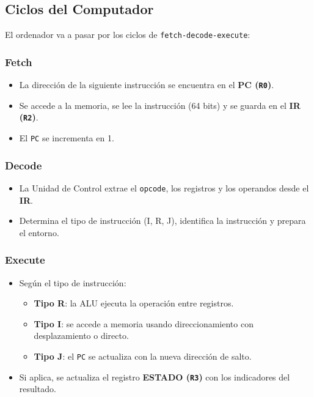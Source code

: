 \documentclass{article}
\begin{document}
\subsection{Ciclos del Computador}

El ordenador va a pasar por los ciclos de \texttt{fetch-decode-execute}:

\subsubsection{Fetch}

\begin{itemize}
  \item La dirección de la siguiente instrucción se encuentra en el \textbf{PC (\texttt{R0})}.
  \item Se accede a la memoria, se lee la instrucción (64 bits) y se guarda en el \textbf{IR (\texttt{R2})}.
  \item El \texttt{PC} se incrementa en 1.
\end{itemize}

\subsubsection{Decode}

\begin{itemize}
  \item La Unidad de Control extrae el \texttt{opcode}, los registros y los operandos desde el \textbf{IR}.
  \item Determina el tipo de instrucción (I, R, J), identifica la instrucción y prepara el entorno.
\end{itemize}

\subsubsection{Execute}

\begin{itemize}
  \item Según el tipo de instrucción:
        \begin{itemize}
          \item \textbf{Tipo R}: la ALU ejecuta la operación entre registros.
          \item \textbf{Tipo I}: se accede a memoria usando direccionamiento con desplazamiento o directo.
          \item \textbf{Tipo J}: el \texttt{PC} se actualiza con la nueva dirección de salto.
        \end{itemize}
  \item Si aplica, se actualiza el registro \textbf{ESTADO (\texttt{R3})} con los indicadores del resultado.
\end{itemize}
\end{document}
